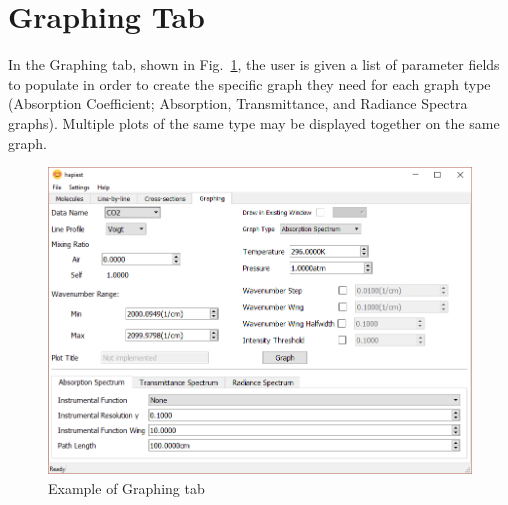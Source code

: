 \documentclass[12pt]{article}
\begin{document}
\section{Graphing Tab}
In the Graphing tab, shown in Fig.~\ref{fig:graphing}, the user is given a list of parameter fields to populate in order to create the specific graph they need for each graph type (Absorption Coefficient; Absorption, Transmittance, and Radiance Spectra graphs). Multiple plots of the same type may be displayed together on the same graph.
\begin{figure}[h]
\centering
\includegraphics[scale = 0.6]{hapiest_graphing}
\caption{Example of Graphing tab}
\label{fig:graphing}
\end{figure}

\end{document}
